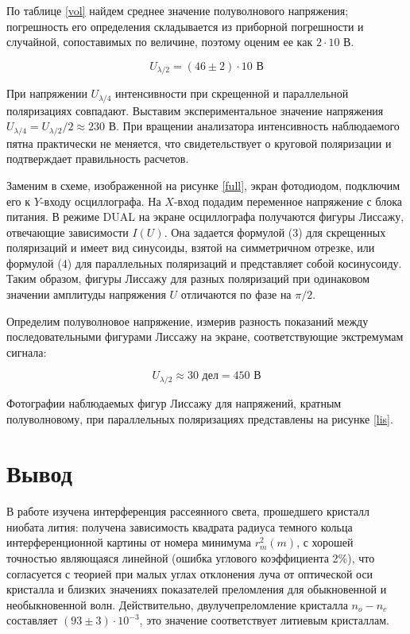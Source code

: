 \documentclass[a4paper,12pt]{article}
\begin{document}
По таблице \ref{vol} найдем среднее значение полуволнового напряжения; погрешность его определения складывается из приборной погрешности и случайной, сопоставимых по величине, поэтому оценим ее как $2\cdot 10$ В. 

\[ U_{\lambda/2} = (46 \pm 2) \cdot 10 \text{ В} \] 

При напряжении $U_{\lambda/4}$ интенсивности при скрещенной и параллельной поляризациях совпадают. Выставим экспериментальное значение напряжения $U_{\lambda/4} = U_{\lambda/2}/2 \approx 230$ В. При вращении анализатора интенсивность наблюдаемого пятна практически не меняется, что свидетельствует о круговой поляризации и подтверждает правильность расчетов.  

Заменим в схеме, изображенной на рисунке \ref{full}, экран фотодиодом, подключим его к $Y$-входу осциллографа. На $X$-вход подадим переменное напряжение с блока питания. В режиме DUAL на экране осциллографа получаются фигуры Лиссажу, отвечающие зависимости $I(U)$. Она задается формулой (3) для скрещенных поляризаций и имеет вид синусоиды, взятой на симметричном отрезке, или формулой (4) для параллельных поляризаций и представляет собой косинусоиду. Таким образом, фигуры Лиссажу для разных поляризаций при одинаковом значении амплитуды напряжения $U$ отличаются по фазе на $\pi/2$.

Определим полуволновое напряжение, измерив разность показаний между последовательными фигурами Лиссажу на экране, соответствующие экстремумам сигнала: 

\[ U_{\lambda/2} \approx 30 \text{ дел} = 450 \text{ В} \]

Фотографии наблюдаемых фигур Лиссажу для напряжений, кратным полуволновому, при параллельных поляризациях представлены на рисунке \ref{lis}.

\section*{Вывод}

В работе изучена интерференция рассеянного света, прошедшего кристалл ниобата лития: получена зависимость квадрата радиуса темного кольца интерференционной картины от номера минимума $r_m^2(m)$, с хорошей точностью являющаяся линейной (ошибка углового коэффициента 2\%), что согласуется с теорией при малых углах отклонения луча от оптической оси кристалла и близких значениях показателей преломления для обыкновенной и необыкновенной волн. Действительно, двулучепреломление кристалла $n_o - n_e$ составляет $(93 \pm 3) \cdot 10^{-3}$, это значение соответствует литиевым кристаллам. 
\end{document}
